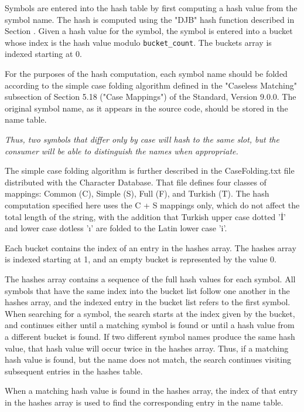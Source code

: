 Symbols are entered into the hash table by first computing a hash
value from the symbol name. The hash is computed 
using the "DJB" hash function 
described in Section .
Given a hash value for the symbol,
the symbol is entered into a bucket whose index is the hash value
modulo \texttt{bucket\_count}. The buckets array is indexed starting at 0.

For the purposes of the hash computation, each symbol name should be
folded according to the simple case folding algorithm defined in the
"Caseless Matching" subsection of Section 5.18 ("Case Mappings") of
the  Standard, Version 9.0.0. The original symbol 
name, as it appears in the source code, should be stored in the name 
table.

\textit{Thus, two symbols that differ only by case will hash to
the same slot, but the consumer will be able to distinguish the names
when appropriate.}

The simple case folding algorithm is further described
in the CaseFolding.txt file distributed with the  
Character Database. That file defines four classes of mappings: 
Common (C), Simple (S), Full (F), and Turkish (T). 
The hash computation specified here uses the C + S mappings only, 
which do not affect the total length of the string, with the addition 
that Turkish upper case dotted '\.{I}' and lower case dotless '\i'
are folded to the Latin lower case 'i'.

Each bucket contains the index of an entry in the hashes array. The
hashes array is indexed starting at 1, and an empty bucket is
represented by the value 0.

The hashes array contains a sequence of the full hash values for each
symbol. All symbols that have the same index into the bucket list 
follow one another in the hashes array, and the indexed entry in 
the bucket list refers to the first symbol. 
When searching for a symbol, the search 
starts at the index given by the bucket, and continues either until a
matching symbol is found or until a hash value from a different bucket
is found. If two different symbol names produce the same hash value,
that hash value will occur twice in the hashes array. Thus, if a
matching hash value is found, but the name does not match, the search
continues visiting subsequent entries in the hashes table.

When a matching hash value is found in the hashes array, the index of
that entry in the hashes array is used to find the corresponding entry
in the name table.


